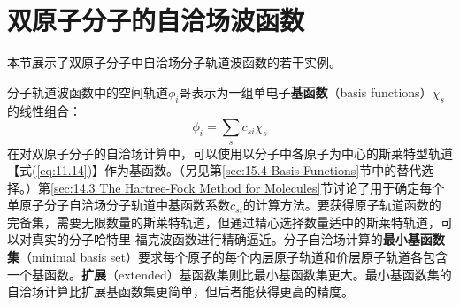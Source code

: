 \section{双原子分子的自洽场波函数}
\label{sec:13.14 SCF Wave Functions for Diatomic Molecules}

    本节展示了双原子分子中自洽场分子轨道波函数的若干实例。

    分子轨道波函数中的空间轨道$\phi_i$哥表示为一组单电子\textbf{基函数}（basis functions）$\chi_s$的线性组合：
    \begin{equation}
        \phi_i = \sum_s c_{si} \chi_s
        \label{eq:13.122}
    \end{equation}
    在对双原子分子的自洽场计算中，可以使用以分子中各原子为中心的斯莱特型轨道【式(\ref{eq:11.14})】作为基函数。（另见第\ref{sec:15.4 Basis Functions}节中的替代选择。）第\ref{sec:14.3 The Hartree-Fock Method for Molecules}节讨论了用于确定每个单原子分子自洽场分子轨道中基函数系数$c_{si}$的计算方法。要获得原子轨道函数的完备集，需要无限数量的斯莱特轨道，但通过精心选择数量适中的斯莱特轨道，可以对真实的分子哈特里-福克波函数进行精确逼近。分子自洽场计算的\textbf{最小基函数集}（minimal basis set）要求每个原子的每个内层原子轨道和价层原子轨道各包含一个基函数。\textbf{扩展}（extended）基函数集则比最小基函数集更大。最小基函数集的自洽场计算比扩展基函数集更简单，但后者能获得更高的精度。

